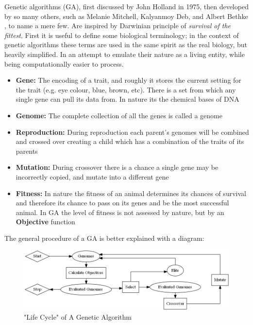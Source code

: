 \documentclass[11pt]{article}
\begin{document}
    Genetic algorithms (GA), first 
    discussed by John Holland \cite{Holland} in 1975, then developed by so many
    others, such as Melanie Mitchell, Kalyanmoy Deb, and Albert Bethke
    \cite{Mitchell, KalyanmoyDeb, Bethke, Goldberg, Grefenstette}, to name a mere few.
    Are inspired by Darwinian
    principle of \textit{survival of the fittest}.
    First it is useful to define some biological terminology; in the context of
    genetic algorithms these terms are used in the same spirit as the real biology,
    but heavily simplified. In an attempt to emulate their nature as a living entity,
    while being computationally easier to process.

    \begin{itemize}
        \item{\textbf{Gene:} The encoding of a trait, and roughly it stores the current
            setting for the trait (e.g. eye colour, blue, brown, etc). There is a set
            from which any single gene can pull its data from. In nature its the chemical
            bases  of DNA}
        \item{\textbf{Genome:} The complete collection of all the genes is called a
            genome}
        \item{\textbf{Reproduction:} During reproduction each parent's genomes will be
            combined and crossed over creating a child which has a combination of
            the traits of its parents}
        \item{\textbf{Mutation:} During crossover there is a chance a single gene
            may be incorrectly copied, and mutate into a different gene}
        \item{\textbf{Fitness: } In nature the fitness of an animal determines
            its chances of survival and therefore its chance to pass on its genes
            and be the most successful animal. In GA the level of fitness is not assessed
            by nature, but by an \textbf{Objective} function}
    \end{itemize}

    The general procedure of a GA is better explained with a diagram:

    \begin{figure}[H] %
        \centering
        \includegraphics[width=\textwidth]{GA}
        \caption{"Life Cycle" of A Genetic Algorithm}\label{fig:GA}
    \end{figure}
\end{document}
